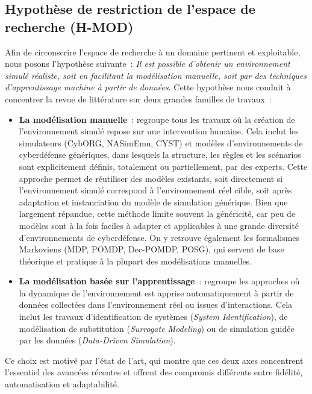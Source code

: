 \subsection*{Hypothèse de restriction de l’espace de recherche (H-MOD)}

Afin de circonscrire l’espace de recherche à un domaine pertinent et exploitable, nous posons l’hypothèse suivante~: \textit{Il est possible d’obtenir un environnement simulé réaliste, soit en facilitant la modélisation manuelle, soit par des techniques d’apprentissage machine à partir de données}. Cette hypothèse nous conduit à concentrer la revue de littérature sur deux grandes familles de travaux~:

\begin{itemize}
  \item \textbf{La modélisation manuelle}~: regroupe tous les travaux où la création de l’environnement simulé repose sur une intervention humaine. Cela inclut les simulateurs (CybORG, NASimEmu, CYST) et modèles d’environnements de cyberdéfense génériques, dans lesquels la structure, les règles et les scénarios sont explicitement définis, totalement ou partiellement, par des experts. Cette approche permet de réutiliser des modèles existants, soit directement si l’environnement simulé correspond à l’environnement réel cible, soit après adaptation et instanciation du modèle de simulation générique. Bien que largement répandue, cette méthode limite souvent la généricité, car peu de modèles sont à la fois faciles à adapter et applicables à une grande diversité d’environnements de cyberdéfense. On y retrouve également les formalismes Markoviens (MDP, POMDP, Dec-POMDP, POSG), qui servent de base théorique et pratique à la plupart des modélisations manuelles.
  \item \textbf{La modélisation basée sur l'apprentissage}~: regroupe les approches où la dynamique de l’environnement est apprise automatiquement à partir de données collectées dans l’environnement réel ou issues d’interactions. Cela inclut les travaux d’identification de systèmes (\textit{System Identification}), de modélisation de substitution (\textit{Surrogate Modeling}) ou de simulation guidée par les données (\textit{Data-Driven Simulation}).
\end{itemize}

Ce choix est motivé par l’état de l’art, qui montre que ces deux axes concentrent l’essentiel des avancées récentes et offrent des compromis différents entre fidélité, automatisation et adaptabilité.

